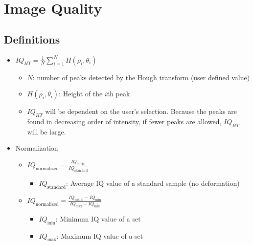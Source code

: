 \documentclass[letterpaper]{article}
\begin{document}
	\section{Image Quality}
		\subsection{Definitions}
			\begin{itemize}
				\item $IQ_{HT} = \frac{1}{N} \sum\limits_{i=1}^N {H(\rho_i, \theta_i)}$
					\begin{itemize}
						\item $N$: number of peaks detected by the Hough transform (user defined value)
						\item $H(\rho_i, \theta_i)$: Height of the $i$th peak
						\item $IQ_{HT}$ will be dependent on the user's selection. Because the peaks are found in decreasing order of intensity, if fewer peaks are allowed, $IQ_{HT}$ will be large.
					\end{itemize}
				\item Normalization
					\begin{itemize}
						\item $IQ_{\text{normalized}} = \frac{IQ_{\text{initial}}}{IQ_{\text{standard}}}$
							\begin{itemize}
								\item $IQ_{\text{standard}}$: Average IQ value of a standard sample (no deformation)
							\end{itemize}
						\item $IQ_{\text{normalized}} = \frac{IQ_{\text{initial}} - IQ_{\text{min}}}{IQ_{\text{max}} - IQ_{\text{min}}}$
							\begin{itemize}
								\item $IQ_{\text{min}}$: Minimum IQ value of a set
								\item $IQ_{\text{max}}$: Maximum IQ value of a set
							\end{itemize}
					\end{itemize}
			\end{itemize}
		
\end{document}
